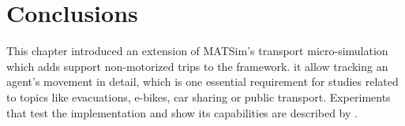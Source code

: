 %
%
%
%

\section{Conclusions}
This chapter introduced an extension of MATSim's transport micro-simulation which adds support non-motorized trips to the framework. it allow tracking an agent's movement in detail, which is one essential requirement for studies related to topics like evacuations, e-bikes, car sharing or public transport. Experiments that test the implementation and show its capabilities are described by \citet{Dobler_PhDThesis_2013}.

